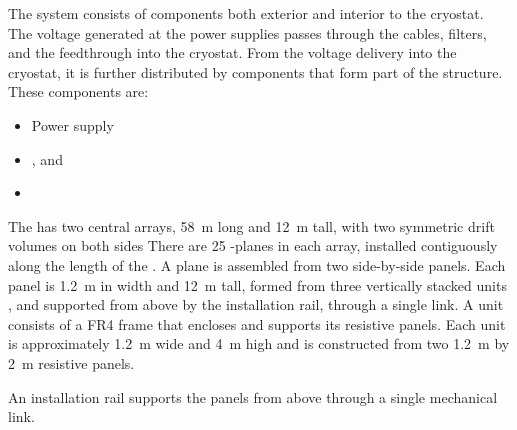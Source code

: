 The  system consists of components both exterior and interior to the cryostat. The voltage generated at the  power supplies passes through the cables, filters, and the  feedthrough into the cryostat. From the voltage delivery into the cryostat, it is further distributed by components that form part of the  structure. 
These components are:
\begin{itemize}
\item Power supply 
\item {},  and 
\item {}
\end{itemize}


The  has two central  arrays, \SI{58}{\meter} long and \SI{12}{\meter} tall, with two symmetric drift volumes on both sides
 There are 25 -planes in each  array, installed contiguously along the length of the . A  plane is assembled from two side-by-side  panels. Each  panel is  \SI{1.2}{\m} in width and  \SI{12}{\m} tall, formed from three vertically stacked  units
, and supported from above by the  installation rail, through a single link.
A  unit consists of a FR4 frame that encloses and supports its resistive panels.  Each  unit is approximately \SI{1.2}{\m} wide and \SI{4}{\m} high and is constructed from two \SI{1.2}{\m} by \SI{2}{\m} resistive panels.


An  installation rail supports the panels from above through a single mechanical link.

